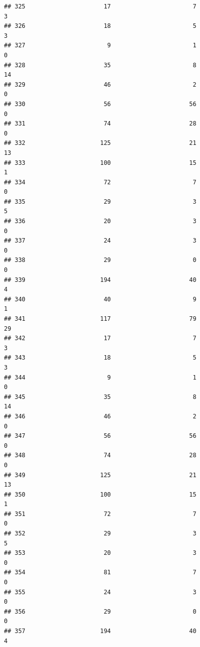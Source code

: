 \documentclass[
]{article}
\begin{document}
\begin{verbatim}
## 325                      17                       7                        3
## 326                      18                       5                        3
## 327                       9                       1                        0
## 328                      35                       8                       14
## 329                      46                       2                        0
## 330                      56                      56                        0
## 331                      74                      28                        0
## 332                     125                      21                       13
## 333                     100                      15                        1
## 334                      72                       7                        0
## 335                      29                       3                        5
## 336                      20                       3                        0
## 337                      24                       3                        0
## 338                      29                       0                        0
## 339                     194                      40                        4
## 340                      40                       9                        1
## 341                     117                      79                       29
## 342                      17                       7                        3
## 343                      18                       5                        3
## 344                       9                       1                        0
## 345                      35                       8                       14
## 346                      46                       2                        0
## 347                      56                      56                        0
## 348                      74                      28                        0
## 349                     125                      21                       13
## 350                     100                      15                        1
## 351                      72                       7                        0
## 352                      29                       3                        5
## 353                      20                       3                        0
## 354                      81                       7                        0
## 355                      24                       3                        0
## 356                      29                       0                        0
## 357                     194                      40                        4

\end{verbatim}
\end{document}
